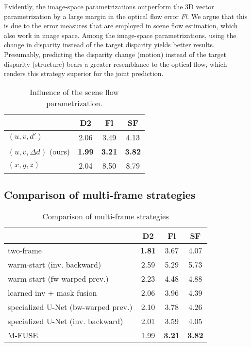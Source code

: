 \documentclass[10pt,twocolumn,letterpaper]{article}
\begin{document}
Evidently, the image-space parametrizations outperform the 3D vector parametrization by a large margin in the optical flow error \emph{Fl}.
We argue that this is due to the error measures that are employed in scene flow estimation, which also work in image space.
Among the image-space parametrizations, using the change in disparity instead of the target disparity yields better results.
Presumably, predicting the disparity change (motion) instead of the target disparity (structure) bears a greater resemblance to the optical flow, which renders this strategy superior for the joint prediction.
\begin{table}
\caption{Influence of the scene flow parametrization.}
\label{tab:sf_param}
\begin{center}
\begin{tabular}{lccc}
\toprule
& D2 & Fl & SF
\\
\midrule
\midrule
$(u,v,d')$ & 2.06 & 3.49 & 4.13
\\
$(u,v,\Delta d)$ (ours) & \textbf{1.99} & \textbf{3.21} & \textbf{3.82}
\\
$(x,y,z)$ & 2.04 & 8.50 & 8.79
\\
\bottomrule
\end{tabular}
\end{center}
\end{table}

\subsection{Comparison of multi-frame strategies}
\begin{table}
\setlength\tabcolsep{4pt}
\caption{Comparison of multi-frame strategies}
\label{tab:comparisonStrategies}
\begin{center}
\begin{tabular}{lccc}
\toprule
& D2 & Fl & SF
\\
\midrule
\midrule
two-frame & \textbf{1.81} & 3.67 & 4.07
\\
\midrule
warm-start (inv. backward) & 2.59 & 5.29 & 5.73
\\
warm-start (fw-warped prev.) & 2.23 & 4.48 & 4.88
\\
\midrule
learned inv + mask fusion & 2.06 & 3.96 & 4.39
\\
\midrule
specialized U-Net (bw-warped prev.) & 2.10 & 3.78 & 4.26
\\
specialized U-Net (inv. backward) & 2.01 & 3.59 & 4.05
\\
\midrule
M-FUSE & 1.99 & \textbf{3.21} & \textbf{3.82}
\\
\bottomrule
\end{tabular}
\end{center}
\end{table}
\end{document}
